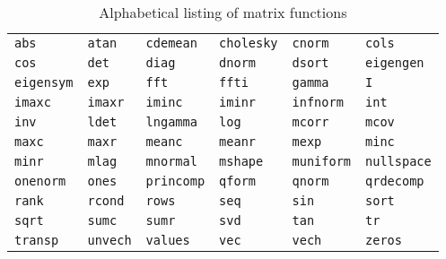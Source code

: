 \begin{table}[p]
\centering
\begin{tabular}{llllll}
\texttt{abs}       &
\texttt{atan}      &
\texttt{cdemean}   &
\texttt{cholesky}  &
\texttt{cnorm}     &
\texttt{cols}      \\
\texttt{cos}       &
\texttt{det}       &
\texttt{diag}      &
\texttt{dnorm}     &
\texttt{dsort}     &
\texttt{eigengen}  \\
\texttt{eigensym}  &
\texttt{exp}       &
\texttt{fft}       &
\texttt{ffti}      &
\texttt{gamma}     &
\texttt{I}         \\
\texttt{imaxc}     &
\texttt{imaxr}     &
\texttt{iminc}     &
\texttt{iminr}     &
\texttt{infnorm}   &
\texttt{int}       \\
\texttt{inv}       &
\texttt{ldet}      &
\texttt{lngamma}   &
\texttt{log}       &
\texttt{mcorr}     &
\texttt{mcov}      \\
\texttt{maxc}      &   
\texttt{maxr}      &
\texttt{meanc}     &
\texttt{meanr}     &
\texttt{mexp}      &
\texttt{minc}      \\  
\texttt{minr}      &
\texttt{mlag}      &
\texttt{mnormal}   &
\texttt{mshape}    &
\texttt{muniform}  &
\texttt{nullspace} \\
\texttt{onenorm}   &
\texttt{ones}      &
\texttt{princomp}  &
\texttt{qform}     &
\texttt{qnorm}     &
\texttt{qrdecomp}  \\
\texttt{rank}      &
\texttt{rcond}     &
\texttt{rows}      &
\texttt{seq}       &
\texttt{sin}       &
\texttt{sort}      \\
\texttt{sqrt}      &
\texttt{sumc}      &
\texttt{sumr}      &
\texttt{svd}       &
\texttt{tan}       &
\texttt{tr}        \\
\texttt{transp}    &
\texttt{unvech}    &
\texttt{values}    &
\texttt{vec}       &
\texttt{vech}      &
\texttt{zeros}     
\end{tabular}      
\caption{Alphabetical listing of matrix functions}
\label{tab:matrix_funcs}
\end{table}

